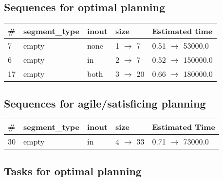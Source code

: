 \documentclass{article}
\begin{document}
                            \subsection*{Sequences for optimal planning}

                            \begin{center}
                            \begin{tabular}{@{}l|l|l|l|l@{}}
                            \# & segment\_type & inout & size & Estimated time\\\midrule
                            7&empty&none&1 $\rightarrow$ 7&0.51 $\rightarrow$ 53000.0\\
6&empty&in&2 $\rightarrow$ 7&0.52 $\rightarrow$ 150000.0\\
17&empty&both&3 $\rightarrow$ 20&0.66 $\rightarrow$ 180000.0
                            \end{tabular}
                            \end{center}
                    
                         \subsection*{Sequences for agile/satisficing planning}

                        \begin{center}
                        \begin{tabular}{@{}l|l|l|l|l@{}}
                        \# & segment\_type & inout & size & Estimated Time\\\midrule
                        30&empty&in&4 $\rightarrow$ 33&0.71 $\rightarrow$ 73000.0
                        \end{tabular}
                        \end{center}
                    
                                \subsection*{Tasks for optimal planning}
                                
\end{document}
